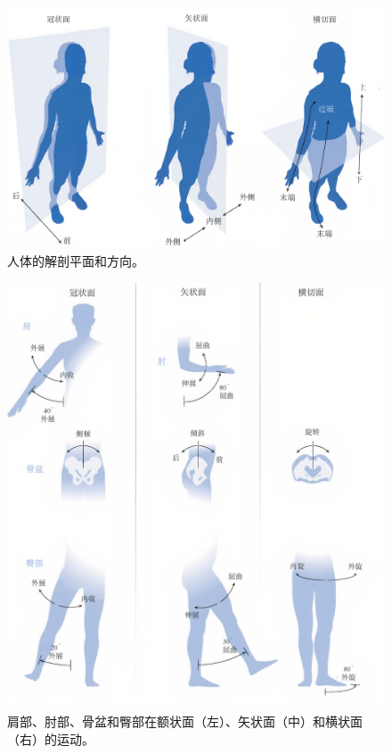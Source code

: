 \begin{figure}[!htb]
	\centering
	\includegraphics[width=1.0\linewidth]{chap1/1_15}
	\caption{人体的解剖平面和方向。 \label{fig:1_15}}
\end{figure}


\begin{figure}[!htb]
	\centering
	\includegraphics[width=1.0\linewidth]{chap1/1_16}
	\caption{肩部、肘部、骨盆和臀部在额状面（左）、矢状面（中）和横状面（右）的运动。 \label{fig:1_16}}
\end{figure}


